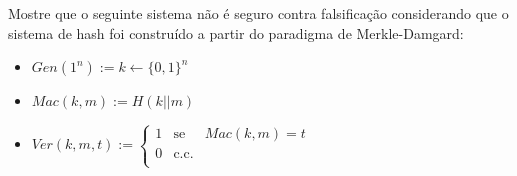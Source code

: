 \begin{exercicio}
  Mostre que o seguinte sistema não é seguro contra falsificação considerando que o sistema de hash foi construído a partir do paradigma de Merkle-Damgard:
\begin{itemize}
\item $Gen(1^n) := k \leftarrow \{0,1\}^n$
\item $Mac(k,m) := H(k||m)$
\item $Ver(k,m,t) := \left\{
    \begin{array}{lcl}
      1 & \textrm{se} & Mac(k,m) = t\\
      0 & \textrm{c.c.} &\\
    \end{array}
    \right.$ 
\end{itemize}
\end{exercicio}


